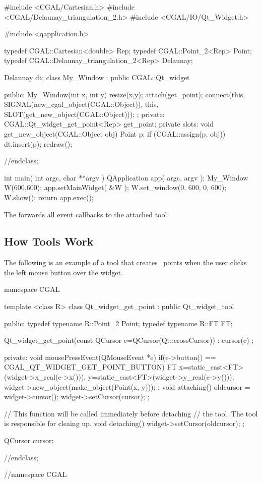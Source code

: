 \begin{ccExampleCode}
#include <CGAL/Cartesian.h>
#include <CGAL/Delaunay_triangulation_2.h>
#include <CGAL/IO/Qt_Widget.h>

#include <qapplication.h>

typedef CGAL::Cartesian<double>             Rep;
typedef CGAL::Point_2<Rep>                  Point;
typedef CGAL::Delaunay_triangulation_2<Rep> Delaunay;

Delaunay dt;
class My_Window : public CGAL::Qt_widget {
public:
  My_Window(int x, int y){
    resize(x,y);
    attach(get_point);
    connect(this, SIGNAL(new_cgal_object(CGAL::Object)), 
            this, SLOT(get_new_object(CGAL::Object)));
  };
private:
  CGAL::Qt_widget_get_point<Rep> get_point;   
private slots:
  void get_new_object(CGAL::Object obj)
  {
    Point p;
    if (CGAL::assign(p, obj)) { 
      dt.insert(p);
    }
    redraw();
  }

}//endclass;

int main( int argc, char **argv )
{
    QApplication app( argc, argv );
    My_Window W(600,600);
    app.setMainWidget( &W );
    W.set_window(0, 600, 0, 600);
    W.show();
    return app.exec();
}
\end{ccExampleCode}

The  forwards all event callbacks to the attached tool.


\subsection{How Tools Work}

The following is an example of a tool that creates \cgal\ points when the user 
clicks the left mouse button over the widget. 
 
\begin{ccExampleCode}
namespace CGAL {

template <class R>
class Qt_widget_get_point : public Qt_widget_tool
{
public:
  typedef typename R::Point_2   Point;
  typedef typename R::FT        FT;
  
  Qt_widget_get_point(const QCursor c=QCursor(Qt::crossCursor)) :
    cursor(c) {};
  
private:
  void mousePressEvent(QMouseEvent *e)
  {
    if(e->button() == CGAL_QT_WIDGET_GET_POINT_BUTTON)
    {
      FT
        x=static_cast<FT>(widget->x_real(e->x())),
        y=static_cast<FT>(widget->y_real(e->y()));
      widget->new_object(make_object(Point(x, y)));
    }
  };
  void attaching()
  {
    oldcursor = widget->cursor();
    widget->setCursor(cursor);
  };
  
  // This function will be called immediately before detaching
  // the tool. The tool is responsible for cleaing up.
  void detaching()
  {
    widget->setCursor(oldcursor);
  };

  QCursor cursor;
}//endclass;
}//namespace CGAL
\end{ccExampleCode}


